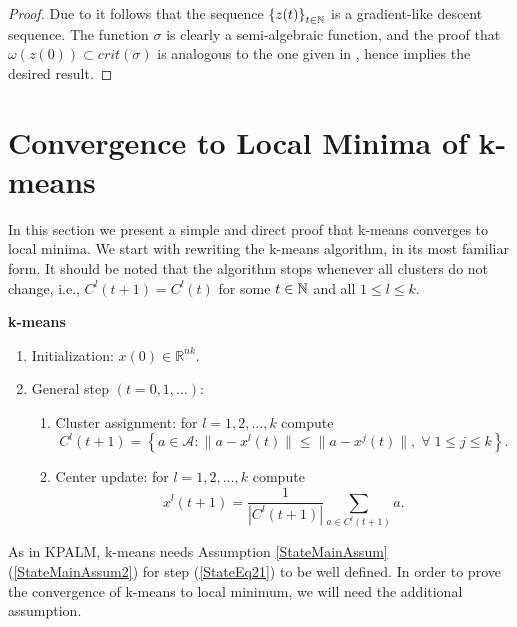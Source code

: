 \begin{proof}
Due to  it follows that the sequence $\left\lbrace z(t) \right\rbrace_{t \in \mathbb{N}}$ is a gradient-like descent sequence. The function $\sigma$ is clearly a semi-algebraic function, and the proof that $\omega(z(0)) \subset crit(\sigma)$ is analogous to the one given in , hence  implies the desired result.
\end{proof}

\section{Convergence to Local Minima of k-means}

In this section we present a simple and direct proof that k-means converges to local minima. We start with rewriting the k-means algorithm, in its most familiar form. It should be noted that the algorithm stops whenever all clusters do not change, i.e., $C^l(t+1)=C^l(t)$ for some $t \in \mathbb{N}$ and all $1 \leq l \leq k$.
\clearpage
\begin{framed}
\noindent \textbf{k-means}
\begin{enumerate}[(1)]
	\item Initialization: $x(0) \in \mathbb{R}^{nk}$.
	\item General step $\left( t=0,1, \ldots \right)$:
	\begin{enumerate}[(2.1)]
		\item Cluster assignment: for $l=1, 2, \ldots ,k$ compute
		\begin{equation}
			C^l(t+1) = \left\lbrace a \in \mathcal{A} : \| a - x^l(t) \| \leq \|a - x^j(t) \|, \; \forall \; 1 \leq j \leq k \right\rbrace. \label{StateEq20}
		\end{equation}
		\item Center update: for $l=1, 2, \ldots ,k$ compute
		\begin{equation}
			x^l(t+1) = \frac{1}{\left| C^l(t+1) \right|} \sum\limits_{a \in C^l(t+1)} a . \label{StateEq21}
		\end{equation}
	\end{enumerate}
\end{enumerate}
\end{framed}

As in KPALM, k-means needs Assumption \ref{StateMainAssum}(\ref{StateMainAssum2}) for step (\ref{StateEq21}) to be well defined. In order to prove the convergence of k-means to local minimum, we will need the additional assumption.

